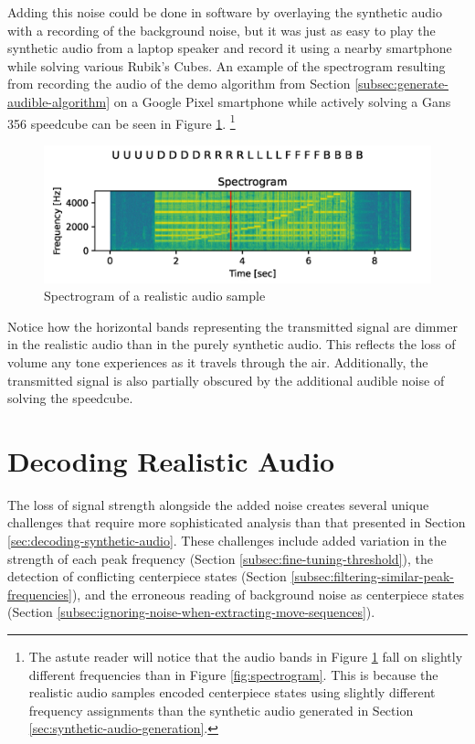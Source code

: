 Adding this noise could be done in software by overlaying the synthetic audio with a recording of the background noise, but it was just as easy to play the synthetic audio from a laptop speaker and record it using a nearby smartphone while solving various Rubik's Cubes.
An example of the spectrogram resulting from recording the audio of the demo algorithm from Section \ref{subsec:generate-audible-algorithm} on a Google Pixel smartphone while actively solving a Gans 356 speedcube can be seen in Figure \ref{fig:noisy-spectrogram}.
\footnote{The astute reader will notice that the audio bands in Figure \ref{fig:noisy-spectrogram} fall on slightly different frequencies than in Figure \ref{fig:spectrogram}. This is because the realistic audio samples encoded centerpiece states using slightly different frequency assignments than the synthetic audio generated in Section \ref{sec:synthetic-audio-generation}.}

\begin{figure}[h]
    \centering
    \caption{Spectrogram of a realistic audio sample}
    \label{fig:noisy-spectrogram}
    \includegraphics[width=0.8\linewidth]{Figures/5 Algorithm Design/transmitted-356-5tps.png}
\end{figure}

Notice how the horizontal bands representing the transmitted signal are dimmer in the realistic audio than in the purely synthetic audio.
This reflects the loss of volume any tone experiences as it travels through the air.
Additionally, the transmitted signal is also partially obscured by the additional audible noise of solving the speedcube.

\section{Decoding Realistic Audio}
\label{sec:decoding-realistic-noise}
The loss of signal strength alongside the added noise creates several unique challenges that require more sophisticated analysis than that presented in Section \ref{sec:decoding-synthetic-audio}.
These challenges include added variation in the strength of each peak frequency (Section \ref{subsec:fine-tuning-threshold}), the detection of conflicting centerpiece states (Section \ref{subsec:filtering-similar-peak-frequencies}), and the erroneous reading of background noise as centerpiece states (Section \ref{subsec:ignoring-noise-when-extracting-move-sequences}).


